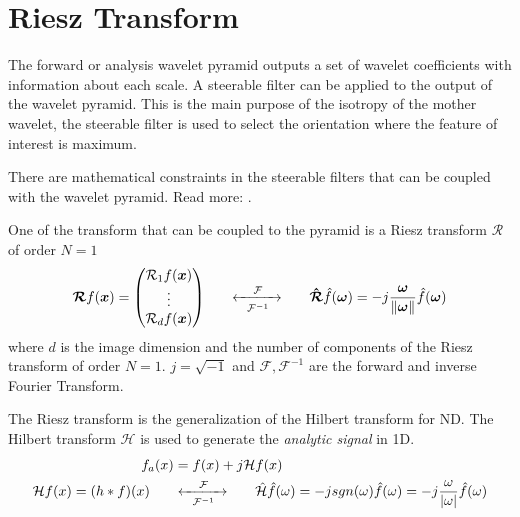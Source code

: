 \section{Riesz Transform}
\label{sec:riesz_transform}
The forward or analysis wavelet pyramid outputs a set of wavelet coefficients with information about each scale.
A steerable filter \cite{held_steerable_2010, unser_steerable_2011, simoncelli_steerable_1995} can be applied to the output of the wavelet pyramid. This is the main purpose of the isotropy of the mother wavelet, the steerable filter is used to select the orientation where the feature of interest is maximum.

There are mathematical constraints in the steerable filters that can be coupled with the wavelet pyramid. Read more: \cite{unser_multiresolution_2009, unser_steerable_2011}.

One of the transform that can be coupled to the pyramid is a Riesz transform $\bm{\mathcal{R}}$ of order $N=1$
\begin{equation}
\bm{\mathcal{R}} f(\bm{x}) =
  \begin{pmatrix}
    \mathcal{R}_{1} f(\bm{x}) \\
    \vdots \\
    \mathcal{R}_d f(\bm{x})
  \end{pmatrix}
  \hspace{0.6cm}
  \xleftrightarrow[\mathcal{F}^{-1}]{\hspace{0.4cm}\mathcal{F}\hspace{0.4cm}}
  \hspace{0.6cm}
  \bm{\hat{\mathcal{R}}}\hat{f}(\bm{\omega}) = -j \frac{\bm{\omega}}{\norm{\bm{\omega}}}\hat{f}(\bm{\omega})
\end{equation}
where $d$ is the image dimension and the number of components of the Riesz transform of order $N=1$. $j=\sqrt{-1}$ and $\mathcal{F}, \mathcal{F}^{-1}$ are the forward and inverse Fourier Transform.\newline

The Riesz transform is the generalization of the Hilbert transform for ND. The Hilbert transform $\mathcal{H}$ is used to generate the \textit{analytic signal} in 1D.
\begin{equation}
\label{eq:analytic-signal}
\begin{aligned}
  f_a(x) &= f(x) + j \mathcal{H}f(x) \\
  \mathcal{H}f(x) = (h * f)(x)
  \hspace{0.6cm}
  &\xleftrightarrow[\mathcal{F}^{-1}]{\hspace{0.4cm}\mathcal{F}\hspace{0.4cm}}
  \hspace{0.6cm}
  \hat{\mathcal{H}}\hat{f}(\omega) = -jsgn(\omega)\hat{f}(\omega) = -j \frac{\omega}{\abs{\omega}}\hat{f}(\omega)
\end{aligned}
\end{equation}

